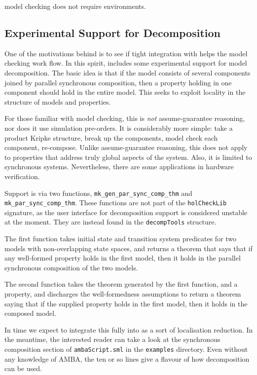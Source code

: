 \ctl model checking does not require environments.

\subsection{Experimental Support for Decomposition}\label{sec:decomp}

One of the motivations behind \hc{} is to see if tight integration with \HOL{} helps the model checking work flow. In this spirit, \hc{}  includes some experimental support for model decomposition. The basic idea is that if the model consists of several components joined by parallel synchronous composition, then a property holding in one component should hold in the entire model. This seeks to exploit locality in the structure of models and properties.

For those familiar with model checking, this is \emph{not} assume-guarantee reasoning, nor does it use simulation pre-orders. It is considerably more simple: take a product Kripke structure, break up the components, model check each component, re-compose. Unlike assume-guarantee reasoning, this does not apply to properties that address truly global aspects of the system. Also, it is limited to synchronous systems. Nevertheless, there are some applications in hardware verification.

Support is via two functions, \texttt{mk\_gen\_par\_sync\_comp\_thm} and \texttt{mk\_par\_sync\_comp\_thm}. These functions are not part of the \texttt{holCheckLib} signature, as the user interface for decomposition support is considered unstable at the moment. They are instead found in the \texttt{decompTools} structure.

The first function takes initial state and transition system predicates for two models with non-overlapping state spaces, and returns a theorem that says that if any well-formed property holds in the first model, then it holds in the parallel synchronous composition of the two models.

The second function takes the theorem generated by the first function, and a property, and discharges the well-formedness assumptions to return a theorem saying that if the supplied property holds in the first model, then it holds in the composed model.

In time we expect to integrate this fully into \hc{} as a sort of localisation reduction. In the meantime, the interested reader can take a look at the synchronous composition section of \texttt{ambaScript.sml} in the \texttt{examples} directory. Even without any knowledge of AMBA, the ten or so lines give a flavour of how decomposition can be used.

